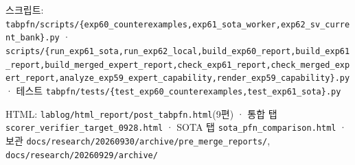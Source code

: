 \par\noindent \textbullet\enspace 스크립트: \texttt{tabpfn/\allowbreak{}\allowbreak{}s\allowbreak{}cripts/\allowbreak{}\allowbreak{}\{\allowbreak{}exp60\_\allowbreak{}\allowbreak{}co\allowbreak{}unterexa\allowbreak{}mples,\allowbreak{}ex\allowbreak{}p61\_\allowbreak{}\allowbreak{}sota\allowbreak{}\_\allowbreak{}\allowbreak{}worker,\allowbreak{}exp62\_\allowbreak{}\allowbreak{}sv\allowbreak{}\_\allowbreak{}\allowbreak{}current\allowbreak{}\_\allowbreak{}\allowbreak{}bank\}\allowbreak{}.\allowbreak{}p\allowbreak{}y} · \texttt{scripts/\allowbreak{}\allowbreak{}\{\allowbreak{}run\_\allowbreak{}\allowbreak{}exp\allowbreak{}61\_\allowbreak{}\allowbreak{}sota,\allowbreak{}run\_\allowbreak{}\allowbreak{}exp6\allowbreak{}2\_\allowbreak{}\allowbreak{}local,\allowbreak{}build\_\allowbreak{}\allowbreak{}ex\allowbreak{}p60\_\allowbreak{}\allowbreak{}repo\allowbreak{}rt,\allowbreak{}build\allowbreak{}\_\allowbreak{}\allowbreak{}exp61\_\allowbreak{}\allowbreak{}r\allowbreak{}eport,\allowbreak{}bu\allowbreak{}ild\_\allowbreak{}\allowbreak{}merg\allowbreak{}ed\_\allowbreak{}\allowbreak{}exper\allowbreak{}t\_\allowbreak{}\allowbreak{}report\allowbreak{},\allowbreak{}check\_\allowbreak{}\allowbreak{}e\allowbreak{}xp61\_\allowbreak{}\allowbreak{}rep\allowbreak{}ort,\allowbreak{}chec\allowbreak{}k\_\allowbreak{}\allowbreak{}merged\allowbreak{}\_\allowbreak{}\allowbreak{}expert\_\allowbreak{}\allowbreak{}report,\allowbreak{}a\allowbreak{}nalyze\_\allowbreak{}\allowbreak{}e\allowbreak{}xp59\_\allowbreak{}\allowbreak{}exp\allowbreak{}ert\_\allowbreak{}\allowbreak{}capa\allowbreak{}bility,\allowbreak{}r\allowbreak{}ender\_\allowbreak{}\allowbreak{}ex\allowbreak{}p59\_\allowbreak{}\allowbreak{}capa\allowbreak{}bility\}\allowbreak{}.\allowbreak{}py} · 테스트 \texttt{tabpfn/\allowbreak{}\allowbreak{}t\allowbreak{}ests/\allowbreak{}\allowbreak{}\{\allowbreak{}te\allowbreak{}st\_\allowbreak{}\allowbreak{}exp60\allowbreak{}\_\allowbreak{}\allowbreak{}counter\allowbreak{}examples\allowbreak{},\allowbreak{}test\_\allowbreak{}\allowbreak{}ex\allowbreak{}p61\_\allowbreak{}\allowbreak{}sota\allowbreak{}\}\allowbreak{}.\allowbreak{}py}


\par\noindent \textbullet\enspace HTML: \texttt{lablog/\allowbreak{}\allowbreak{}h\allowbreak{}tml\_\allowbreak{}\allowbreak{}repo\allowbreak{}rt/\allowbreak{}\allowbreak{}post\_\allowbreak{}\allowbreak{}tabpfn.\allowbreak{}h\allowbreak{}tml}(9편) · 통합 탭 \texttt{scorer\_\allowbreak{}\allowbreak{}v\allowbreak{}erifier\_\allowbreak{}\allowbreak{}target\_\allowbreak{}\allowbreak{}0\allowbreak{}928.\allowbreak{}html\allowbreak{}} · SOTA 탭 \texttt{sota\_\allowbreak{}\allowbreak{}pfn\allowbreak{}\_\allowbreak{}\allowbreak{}compari\allowbreak{}son.\allowbreak{}html\allowbreak{}} · 보관 \texttt{docs/\allowbreak{}\allowbreak{}res\allowbreak{}earch/\allowbreak{}\allowbreak{}20\allowbreak{}260930/\allowbreak{}\allowbreak{}a\allowbreak{}rchive/\allowbreak{}\allowbreak{}p\allowbreak{}re\_\allowbreak{}\allowbreak{}merge\allowbreak{}\_\allowbreak{}\allowbreak{}reports\allowbreak{}/\allowbreak{}\allowbreak{}}, \texttt{docs/\allowbreak{}\allowbreak{}res\allowbreak{}earch/\allowbreak{}\allowbreak{}20\allowbreak{}260929/\allowbreak{}\allowbreak{}a\allowbreak{}rchive/\allowbreak{}\allowbreak{}}


